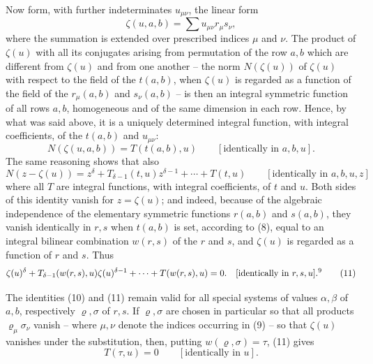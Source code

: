 \documentclass[11pt]{article}
\begin{document}
Now form, with further indeterminates $u_{\mu\nu}$, the linear form
\begin{equation}
 \zeta(u,a,b)=\sum u_{\mu\nu}r_\mu s_\nu,
\tag{9}
\end{equation}
where the summation is extended over prescribed indices $\mu$ and $\nu$. The product of $\zeta(u)$ with all its conjugates arising from permutation of the row $a,b$ which are different from $\zeta(u)$ and from one another -- the norm $N(\zeta(u))$ of $\zeta(u)$ with respect to the field of the $t(a,b)$, when $\zeta(u)$ is regarded as a function of the field of the $r_\mu(a,b)$ and $s_\nu(a,b)$ -- is then an integral symmetric function of all rows $a,b$, homogeneous and of the same dimension in each row. Hence, by what was said above, it is a uniquely determined integral function, with integral coefficients, of the $t(a,b)$ and $u_{\mu\nu}$:
\begin{equation}
 N(\zeta(u,a,b))=T(t(a,b),u)\qquad[\text{identically in }a,b,u].
\tag{10}
\end{equation}
The same reasoning shows that also
\[
N(z-\zeta(u))=z^\delta+T_{\delta-1}(t,u)z^{\delta-1}+\cdots+T(t,u)
\qquad[\text{identically in }a,b,u,z]
\]
where all $T$ are integral functions, with integral coefficients, of $t$ and $u$. Both sides of this identity vanish for $z=\zeta(u)$; and indeed, because of the algebraic independence of the elementary symmetric functions $r(a,b)$ and $s(a,b)$, they vanish identically in $r,s$ when $t(a,b)$ is set, according to (8), equal to an integral bilinear combination $w(r,s)$ of the $r$ and $s$, and $\zeta(u)$ is regarded as a function of $r$ and $s$. Thus
\begin{equation}
\zeta(u)^\delta+T_{\delta-1}(w(r,s),u)\zeta(u)^{\delta-1}+\cdots+T(w(r,s),u)=0.
\quad[\text{identically in }r,s,u].\text{\footnotemark[9]}
\tag{11}
\end{equation}
\setcounter{footnote}{9}

The identities (10) and (11) remain valid for all special systems of values $\alpha,\beta$ of $a,b$, respectively $\varrho,\sigma$ of $r,s$. If $\varrho,\sigma$ are chosen in particular so that all products $\varrho_\mu\sigma_\nu$ vanish -- where $\mu,\nu$ denote the indices occurring in (9) -- so that $\zeta(u)$ vanishes under the substitution, then, putting $w(\varrho,\sigma)=\tau$, (11) gives
\begin{equation}
 T(\tau,u)=0\qquad[\text{identically in }u].
\tag{12}
\end{equation}
\end{document}
